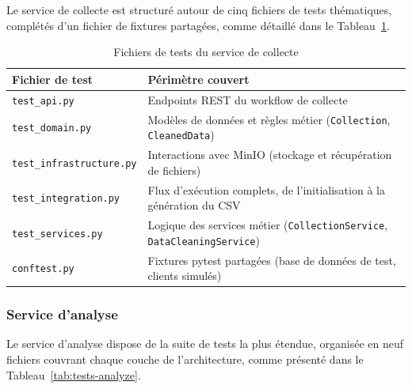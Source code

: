 Le service de collecte est structuré autour de cinq fichiers de tests thématiques, complétés
d'un fichier de fixtures partagées, comme détaillé dans le Tableau~\ref{tab:tests-collection}.

\begin{table}[H]
\centering
\small
\caption{Fichiers de tests du service de collecte}
\label{tab:tests-collection}
\begin{tabular}{|>{\raggedright\arraybackslash}p{4.5cm}
                |>{\raggedright\arraybackslash}p{8.5cm}|}
\hline
\textbf{Fichier de test} & \textbf{Périmètre couvert} \\
\hline
\texttt{test\_api.py} & Endpoints REST du workflow de collecte \\
\hline
\texttt{test\_domain.py} & Modèles de données et règles métier (\texttt{Collection}, \texttt{CleanedData}) \\
\hline
\texttt{test\_infrastructure.py} & Interactions avec MinIO (stockage et récupération de fichiers) \\
\hline
\texttt{test\_integration.py} & Flux d'exécution complets, de l'initialisation à la génération du CSV \\
\hline
\texttt{test\_services.py} & Logique des services métier (\texttt{CollectionService}, \texttt{DataCleaningService}) \\
\hline
\texttt{conftest.py} & Fixtures pytest partagées (base de données de test, clients simulés) \\
\hline
\end{tabular}
\end{table}

\subsubsection*{Service d'analyse}

Le service d'analyse dispose de la suite de tests la plus étendue, organisée en neuf fichiers
couvrant chaque couche de l'architecture, comme présenté dans le Tableau~\ref{tab:tests-analyze}.

